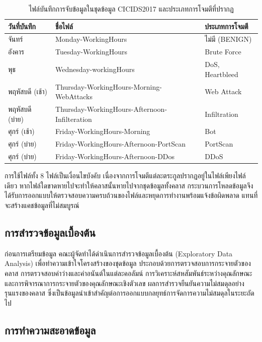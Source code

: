 \begin{table}[ht]
    \caption{ไฟล์บันทึกการจับข้อมูลในชุดข้อมูล CICIDS2017 และประเภทการโจมตีที่ปรากฏ}
    \label{tab:capture-files}
    \small
    \begin{tabularx}{\linewidth}{@{}l X l@{}}
        \hline
        \textbf{วันที่บันทึก} & \textbf{ชื่อไฟล์} & \textbf{ประเภทการโจมตี} \\
        \hline
        จันทร์ & Monday-WorkingHours & ไม่มี (BENIGN) \\
        อังคาร & Tuesday-WorkingHours & Brute Force \\
        พุธ & Wednesday-workingHours & DoS, Heartbleed \\
        พฤหัสบดี (เช้า) & Thursday-WorkingHours-Morning-WebAttacks & Web Attack \\
        พฤหัสบดี (บ่าย) & Thursday-WorkingHours-Afternoon-Infilteration & Infiltration \\
        ศุกร์ (เช้า) & Friday-WorkingHours-Morning & Bot \\
        ศุกร์ (บ่าย) & Friday-WorkingHours-Afternoon-PortScan & PortScan \\
        ศุกร์ (บ่าย) & Friday-WorkingHours-Afternoon-DDos & DDoS \\
        \hline
    \end{tabularx}
\end{table}

การใช้ไฟล์ทั้ง 8 ไฟล์เป็นเงื่อนไขบังคับ เนื่องจากการโจมตีแต่ละตระกูลปรากฏอยู่ในไฟล์เพียงไฟล์เดียว หากไฟล์ใดขาดหายไปจะทำให้คลาสนั้นหายไปจากชุดข้อมูลทั้งคลาส กระบวนการโหลดข้อมูลจึงได้รับการออกแบบให้ตรวจสอบความครบถ้วนของไฟล์และหยุดการทำงานพร้อมแจ้งข้อผิดพลาด แทนที่จะสร้างแคชข้อมูลที่ไม่สมบูรณ์

\subsection{การสำรวจข้อมูลเบื้องต้น}

ก่อนการเตรียมข้อมูล คณะผู้จัดทำได้ดำเนินการสำรวจข้อมูลเบื้องต้น (Exploratory Data Analysis) เพื่อทำความเข้าใจโครงสร้างของชุดข้อมูล ประกอบด้วยการตรวจสอบการกระจายตัวของคลาส การตรวจสอบค่าว่างและค่าอนันต์ในแต่ละคอลัมน์ การวิเคราะห์สหสัมพันธ์ระหว่างคุณลักษณะ และการพิจารณาการกระจายตัวของคุณลักษณะเชิงตัวเลข ผลการสำรวจยืนยันความไม่สมดุลอย่างรุนแรงของคลาส ซึ่งเป็นข้อมูลนำเข้าสำคัญต่อการออกแบบกลยุทธ์การจัดการความไม่สมดุลในระยะถัดไป

\subsection{การทำความสะอาดข้อมูล}

